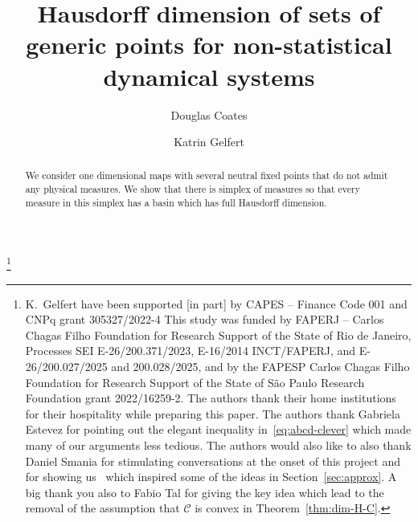 \documentclass[english, 10pt]{amsart}
\numberwithin{equation}{section}
\theoremstyle{definition}
\theoremstyle{plain}
\theoremstyle{plain}
\theoremstyle{definition}
\theoremstyle{definition}
\theoremstyle{plain}
\theoremstyle{definition}
\newcommand{\cC}{{\mathcal C}}
\numberwithin{equation}{section}
\begin{document}
\title[Generic points for non-statistical dynamical systems]{Hausdorff dimension of sets of generic points for non-statistical dynamical systems}

\author[D. Coates]{Douglas Coates}
\address{Institute of Mathematics, Federal University of Rio de Janeiro, Av. Athos da Silveira Ramos 149, Cidade Universit\'aria - Ilha do Fund\~ao, Rio de Janeiro 21945-909, RJ, Brazil}

\author[K. Gelfert]{Katrin Gelfert}
\address{Institute of Mathematics, Federal University of Rio de Janeiro, Av. Athos da Silveira Ramos 149, Cidade Universit\'aria - Ilha do Fund\~ao, Rio de Janeiro 21945-909, RJ, Brazil}
\thanks{K.~Gelfert have been supported [in part] by 
CAPES -- Finance Code 001 and  CNPq grant 305327/2022-4  %
This study was funded by FAPERJ – Carlos Chagas Filho Foundation for Research Support of the State of Rio de Janeiro, Processes SEI E-26/200.371/2023,  %
    E-16/2014 INCT/FAPERJ, and %
    E-26/200.027/2025 and 200.028/2025, %
and by the FAPESP Carlos Chagas Filho Foundation for Research Support of the State of São Paulo Research Foundation grant 2022/16259-2.
The authors thank their home institutions for their hospitality while preparing this paper.
The authors thank Gabriela Estevez for pointing out the elegant inequality in~\eqref{eq:abcd-clever} which made many of our arguments less tedious. The authors would also like to also thank Daniel Smania for stimulating conversations at the onset of this project and for showing us~\cite{MorSma2014} which inspired some of the ideas in Section~\ref{sec:approx}. A big thank you also to Fabio Tal for giving the key idea which lead to the removal of the assumption that $\cC$ is convex in Theorem~\ref{thm:dim-H-C}.
}


\subjclass[2020]{%
}

\begin{abstract}
  We consider one dimensional maps with several neutral fixed points that do not admit any physical measures. We show that there is simplex of measures so that every measure in this simplex has a basin which has full Hausdorff dimension.
\end{abstract}

\maketitle
\end{document}
